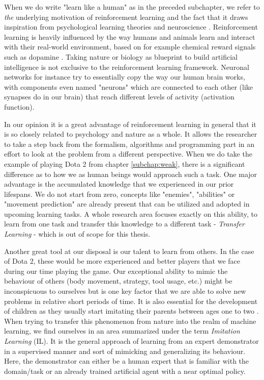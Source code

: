 When we do write "learn like a human" as in the preceded subchapter, we refer to \textit{the} underlying motivation of reinforcement learning and the fact that it draws inspiration from psychological learning theories \cite[p.~341]{Sutton1998} and neuroscience \cite[p.~377]{Sutton1998}. Reinforcement learning is heavily influenced by the way humans and animals learn and interact with their real-world environment, based on for example chemical reward signals such as dopamine \cite[p.~383]{Sutton1998}. Taking nature or biology as blueprint to build artificial intelligence is not exclusive to the reinforcement learning framework. Neuronal networks for instance try to essentially copy the way our human brain works, with components even named "neurons" which are connected to each other (like synapses do in our brain) that reach different levels of activity (activation function).
\par
In our opinion it is a great advantage of reinforcement learning in general that it is so closely related to psychology and nature as a whole. It allows the researcher to take a step back from the formalism, algorithms and programming part in an effort to look at the problem from a different perspective. When we do take the example of playing Dota 2 from chapter \ref{subchap:weak}, there is a significant difference as to how we as human beings would approach such a task. One major advantage is the accumulated knowledge that we experienced in our prior lifespans. We do not start from zero, concepts like "enemies", "abilities" or "movement prediction" are already present that can be utilized and adopted in upcoming learning tasks. A whole research area focuses exactly on this ability, to learn from one task and transfer this knowledge to a different task - \textit{Transfer Learning} - which is out of scope for this thesis.
\par
Another great tool at our disposal is our talent to learn from others. In the case of Dota 2, these would be more experienced and better players that we face during our time playing the game. Our exceptional ability to mimic the behaviour of others (body movement, strategy, tool usage, etc.) might be inconspicuous to ourselves but is one key factor that we are able to solve new problems in relative short periods of time. It is also essential for the development of children as they usually start imitating their parents between ages one to two \cite[p.347]{wood2013whom}. When trying to transfer this phenomenon from nature into the realm of machine learning, we find ourselves in an area summarized under the term \textit{Imitation Learning} (IL). It is the general approach of learning from an expert demonstrator in a supervised manner and sort of mimicking and generalizing its behaviour. Here, the demonstrator can either be a human expert that is familiar with the domain/task or an already trained artificial agent with a near optimal policy.

